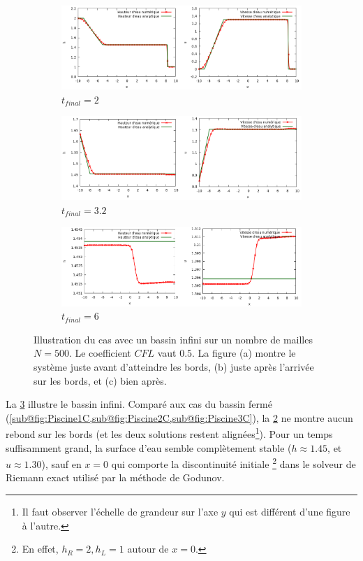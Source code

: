 \documentclass[
	french,
	11pt, %
]{fphw}
\begin{document}
\begin{figure}[H]
	\centering
	\begin{subfigure}[b]{0.9\textwidth}
		\centering
		\includegraphics[width=\textwidth]{Piscineinfinie1.png}
		\caption{$t_{final}=2$}
	\end{subfigure}
	\begin{subfigure}[b]{0.9\textwidth}
		\centering
		\includegraphics[width=\textwidth]{Piscineinfinie2.png}
		\caption{$t_{final}=3.2$}
		\label{fig:InfiniB}
	\end{subfigure}
	\begin{subfigure}[b]{0.9\textwidth}
		\centering
		\includegraphics[width=\textwidth]{Piscineinfinie3.png}
		\caption{$t_{final}=6$}
		\label{fig:InfiniC}
	\end{subfigure}
	\caption{Illustration du cas avec un bassin infini sur un nombre de mailles $N=500$. Le coefficient $CFL$ vaut $0.5$. La figure (a) montre le système juste avant d'atteindre les bords, (b) juste après l'arrivée sur les bords, et (c) bien après.}
	\label{fig:Infini}
\end{figure}

La \cref{fig:Infini} illustre le bassin infini. Comparé aux cas du bassin fermé (\cref{sub@fig:Piscine1C,sub@fig:Piscine2C,sub@fig:Piscine3C}), la \cref{fig:InfiniC} ne montre aucun rebond sur les bords (et les deux solutions restent alignées\footnote{Il faut observer l'échelle de grandeur sur l'axe $y$ qui est différent d'une figure à l'autre.}). Pour un temps suffisamment grand, la surface d'eau semble complètement stable ($h\approx 1.45$, et $u\approx 1.30$), sauf en $x=0$ qui comporte la discontinuité initiale \footnote{En effet, $h_R=2,h_L=1$ autour de $x=0$.} dans le solveur de Riemann exact utilisé par la méthode de Godunov.
\end{document}
